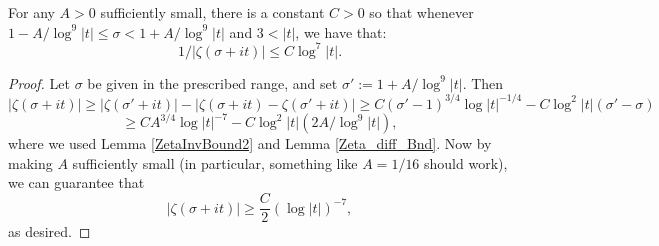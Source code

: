 \begin{lemma}[ZetaInvBnd]
\label{ZetaInvBnd}
\leanok
For any $A>0$ sufficiently small, there is a constant $C>0$ so that
  whenever $1- A / \log^9 |t| \le \sigma < 1+A/\log^9 |t|$ and $3 < |t|$, we have that:
  $$
  1/|\zeta(\sigma+it)| \le C \log^7 |t|.
  $$
\end{lemma}
\begin{proof}
\leanok
Let $\sigma$ be given in the prescribed range, and set $\sigma' := 1+ A / \log^9 |t|$.
  Then
  $$
  |\zeta(\sigma+it)| \ge
  |\zeta(\sigma'+it)| - |\zeta(\sigma+it) - \zeta(\sigma'+it)|
  \ge
  C (\sigma'-1)^{3/4}\log |t|^{-1/4} - C \log^2 |t| (\sigma'-\sigma)
  $$
  $$
  \ge
  C A^{3/4} \log |t|^{-7} - C \log^2 |t| (2 A / \log^9 |t|),
  $$
  where we used Lemma \ref{ZetaInvBound2}  and Lemma \ref{Zeta_diff_Bnd}.
  Now by making $A$ sufficiently small (in particular, something like $A = 1/16$ should work), we can guarantee that
  $$
  |\zeta(\sigma+it)| \ge \frac C 2 (\log |t|)^{-7},
  $$
  as desired.
\end{proof}
